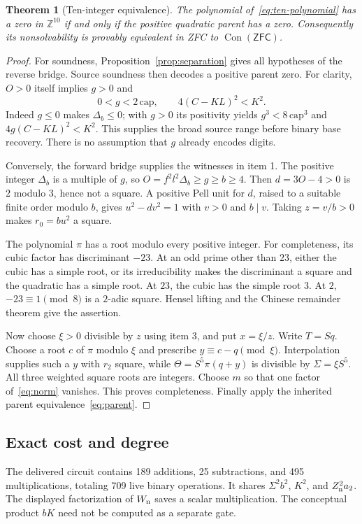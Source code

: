 \documentclass[11pt,letterpaper]{article}
\newtheorem{theorem}{Theorem}[section]
\theoremstyle{remark}\newtheorem{remark}[theorem]{Remark}
\newcommand{\Z}{\mathbb Z}\newcommand{\N}{\mathbb N}
\newcommand{\Con}{\operatorname{Con}}\newcommand{\ZFC}{\mathsf{ZFC}}
\begin{document}
\begin{theorem}[Ten-integer equivalence]\label{thm:ten}
The polynomial of~\eqref{eq:ten-polynomial} has a zero in $\Z^{10}$
if and only if the positive quadratic parent has a zero.
Consequently its nonsolvability is provably equivalent in ZFC to
$\Con(\ZFC)$.
\end{theorem}
\begin{proof}
For soundness, Proposition~\ref{prop:separation} gives all hypotheses
of the reverse bridge. Source soundness then decodes a positive parent
zero. For clarity, $O>0$ itself implies $g>0$ and
\[
 0<g<2\,\mathrm{cap},\qquad 4(C-KL)^2<K^2.
\]
Indeed $g\le0$ makes $\Delta_b\le0$; with $g>0$ its positivity yields
$g^3<8\,\mathrm{cap}^3$ and
$4g(C-KL)^2<K^2$. This supplies the broad source range before binary
base recovery. There is no assumption that $g$ already encodes digits.

Conversely, the forward bridge supplies the witnesses in item 1.
The positive integer $\Delta_b$ is a multiple of $g$, so
$O=f^2l^2\Delta_b\ge g\ge b\ge4$.
Then $d=3O-4>0$ is $2$ modulo $3$, hence not a square.
A positive Pell unit for $d$, raised to a suitable finite order
modulo $b$, gives $u^2-dv^2=1$ with $v>0$ and $b\mid v$.
Taking $z=v/b>0$ makes $r_0=b u^2$ a square.

The polynomial $\pi$ has a root modulo every positive integer.
For completeness, its cubic factor has discriminant $-23$.
At an odd prime other than $23$, either the cubic has a simple root,
or its irreducibility makes the discriminant a square and the
quadratic has a simple root. At $23$, the cubic has the simple root $3$.
At $2$, $-23\equiv1\pmod8$ is a $2$-adic square. Hensel lifting and
the Chinese remainder theorem give the assertion.

Now choose $\xi>0$ divisible by $z$ using item 3, and put $x=\xi/z$.
Write $T=Sq$. Choose a root $c$ of $\pi$ modulo $\xi$ and prescribe
$y\equiv c-q\pmod\xi$. Interpolation supplies such a $y$ with $r_2$
square, while
$\Theta=S^5\pi(q+y)$ is divisible by $\Sigma=\xi S^5$.
All three weighted square roots are integers. Choose $m$ so that
one factor of~\eqref{eq:norm} vanishes. This proves completeness.
Finally apply the inherited parent equivalence~\eqref{eq:parent}.
\end{proof}

\subsection{Exact cost and degree}
The delivered circuit contains 189 additions, 25 subtractions, and
495 multiplications, totaling 709 live binary operations.
It shares $\Sigma^2b^2$, $K^2$, and $Z_{\rm n}^2a_2$.
The displayed factorization of $W_{\rm n}$ saves a scalar multiplication.
The conceptual product $bK$ need not be computed as a separate gate.
\end{document}
